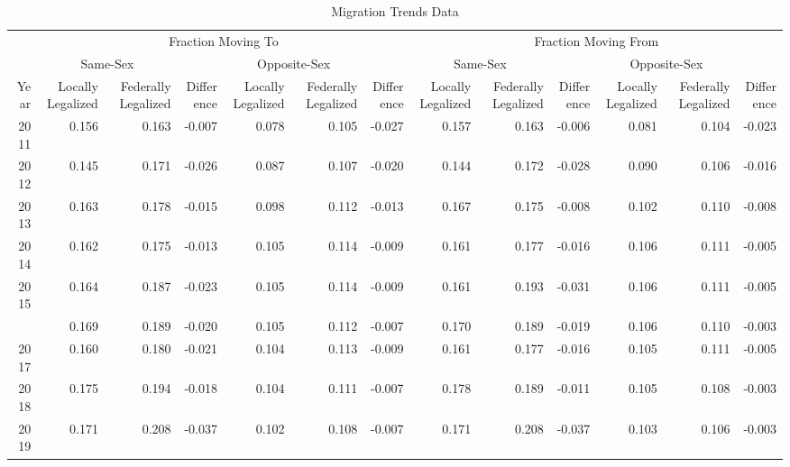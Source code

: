 \begin{table}

\caption{Migration Trends Data}
\centering
\begin{tabular}[t]{rrrrrrrrrrrrr}
\toprule
\multicolumn{1}{c}{ } & \multicolumn{6}{c}{Fraction Moving To} & \multicolumn{6}{c}{Fraction Moving From} \\
\cmidrule(l{3pt}r{3pt}){2-7} \cmidrule(l{3pt}r{3pt}){8-13}
\multicolumn{1}{c}{ } & \multicolumn{2}{c}{Same-Sex} & \multicolumn{1}{c}{ } & \multicolumn{2}{c}{Opposite-Sex} & \multicolumn{1}{c}{ } & \multicolumn{2}{c}{Same-Sex} & \multicolumn{1}{c}{ } & \multicolumn{2}{c}{Opposite-Sex} & \multicolumn{1}{c}{ } \\
\cmidrule(l{3pt}r{3pt}){2-3} \cmidrule(l{3pt}r{3pt}){5-6} \cmidrule(l{3pt}r{3pt}){8-9} \cmidrule(l{3pt}r{3pt}){11-12}
Year & Locally Legalized & Federally Legalized & Difference & Locally Legalized & Federally Legalized & Difference & Locally Legalized & Federally Legalized & Difference & Locally Legalized & Federally Legalized & Difference\\
\midrule
2011 & 0.156 & 0.163 & -0.007 & 0.078 & 0.105 & -0.027 & 0.157 & 0.163 & -0.006 & 0.081 & 0.104 & -0.023\\
2012 & 0.145 & 0.171 & -0.026 & 0.087 & 0.107 & -0.020 & 0.144 & 0.172 & -0.028 & 0.090 & 0.106 & -0.016\\
2013 & 0.163 & 0.178 & -0.015 & 0.098 & 0.112 & -0.013 & 0.167 & 0.175 & -0.008 & 0.102 & 0.110 & -0.008\\
2014 & 0.162 & 0.175 & -0.013 & 0.105 & 0.114 & -0.009 & 0.161 & 0.177 & -0.016 & 0.106 & 0.111 & -0.005\\
2015 & 0.164 & 0.187 & -0.023 & 0.105 & 0.114 & -0.009 & 0.161 & 0.193 & -0.031 & 0.106 & 0.111 & -0.005\\
\addlinespace
2016 & 0.169 & 0.189 & -0.020 & 0.105 & 0.112 & -0.007 & 0.170 & 0.189 & -0.019 & 0.106 & 0.110 & -0.003\\
2017 & 0.160 & 0.180 & -0.021 & 0.104 & 0.113 & -0.009 & 0.161 & 0.177 & -0.016 & 0.105 & 0.111 & -0.005\\
2018 & 0.175 & 0.194 & -0.018 & 0.104 & 0.111 & -0.007 & 0.178 & 0.189 & -0.011 & 0.105 & 0.108 & -0.003\\
2019 & 0.171 & 0.208 & -0.037 & 0.102 & 0.108 & -0.007 & 0.171 & 0.208 & -0.037 & 0.103 & 0.106 & -0.003\\
\bottomrule
\end{tabular}
\end{table}
